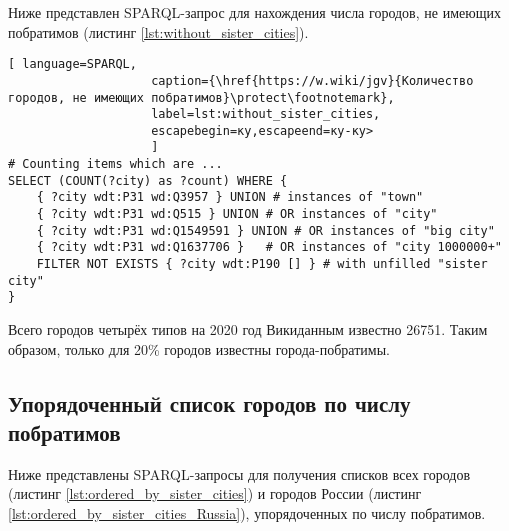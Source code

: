 Ниже представлен SPARQL-запрос для нахождения числа городов, не имеющих побратимов (листинг \ref{lst:without_sister_cities}).


\begin{lstlisting}[ language=SPARQL, 
                    caption={\href{https://w.wiki/jgv}{Количество городов, не имеющих побратимов}\protect\footnotemark},
                    label=lst:without_sister_cities, 
                    escapebegin=ку,escapeend=ку-ку>
                    ]
# Counting items which are ... 
SELECT (COUNT(?city) as ?count) WHERE {                             
	{ ?city wdt:P31 wd:Q3957 } UNION # instances of "town"          
	{ ?city wdt:P31 wd:Q515 } UNION # OR instances of "city"                 
	{ ?city wdt:P31 wd:Q1549591 } UNION # OR instances of "big city"                       
	{ ?city wdt:P31 wd:Q1637706 } 	# OR instances of "city 1000000+"              
	FILTER NOT EXISTS { ?city wdt:P190 [] } # with unfilled "sister city"
}
\end{lstlisting}

Всего городов четырёх типов на 2020 год Викиданным известно \num{26751}. Таким образом, только для 20\% городов известны города-побратимы.

\subsection{Упорядоченный список городов по числу побратимов}

Ниже представлены SPARQL-запросы для получения списков всех городов (листинг \ref{lst:ordered_by_sister_cities}) и городов России (листинг \ref{lst:ordered_by_sister_cities_Russia}), упорядоченных по числу побратимов.


